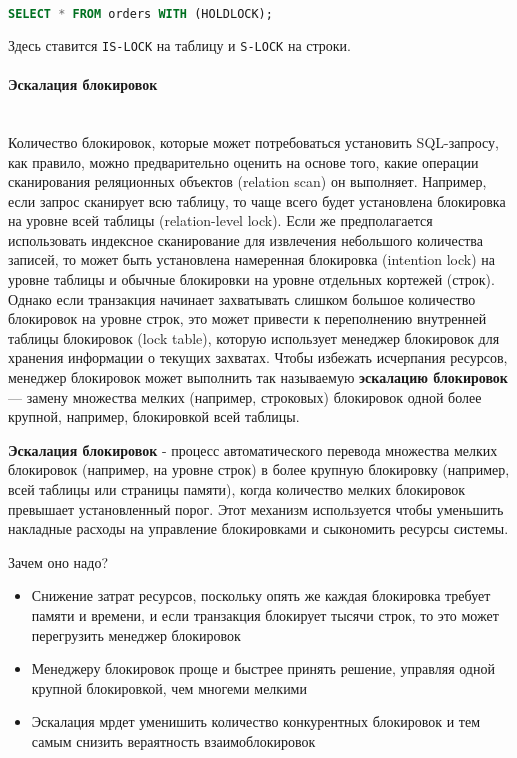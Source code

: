  \begin{lstlisting}[language=SQL]
     SELECT * FROM orders WITH (HOLDLOCK);
 \end{lstlisting}
 
 Здесь ставится \texttt{IS-LOCK} на таблицу и \texttt{S-LOCK} на строки.

\paragraph{Эскалация блокировок} ~\\

Количество блокировок, которые может потребоваться установить SQL-запросу, как правило, можно предварительно оценить на основе того, какие операции сканирования реляционных объектов (relation scan) он выполняет. Например, если запрос сканирует всю таблицу, то чаще всего будет установлена блокировка на уровне всей таблицы (relation-level lock). Если же предполагается использовать индексное сканирование для извлечения небольшого количества записей, то может быть установлена намеренная блокировка (intention lock) на уровне таблицы и обычные блокировки на уровне отдельных кортежей (строк). Однако если транзакция начинает захватывать слишком большое количество блокировок на уровне строк, это может привести к переполнению внутренней таблицы блокировок (lock table), которую использует менеджер блокировок для хранения информации о текущих захватах. Чтобы избежать исчерпания ресурсов, менеджер блокировок может выполнить так называемую \textbf{эскалацию блокировок} — замену множества мелких (например, строковых) блокировок одной более крупной, например, блокировкой всей таблицы. \autocites[ch.18]{Silberschatz}

\begin{grayquote}
    \textbf{Эскалация блокировок} - процесс автоматического перевода множества мелких блокировок (например, на уровне строк) в более крупную блокировку (например, всей таблицы или страницы памяти), когда количество мелких блокировок превышает установленный порог. Этот механизм используется чтобы уменьшить накладные расходы на управление блокировками и сыкономить ресурсы системы.
\end{grayquote}

Зачем оно надо?
\begin{itemize}
    \item Снижение затрат ресурсов, поскольку опять же каждая блокировка требует памяти и времени, и если транзакция блокирует тысячи строк, то это может перегрузить менеджер блокировок
    \item Менеджеру блокировок проще и быстрее принять решение, управляя одной крупной блокировкой, чем многеми мелкими
    \item Эскалация мрдет уменишить количество конкурентных блокировок и тем самым снизить вераятность взаимоблокировок
\end{itemize}

